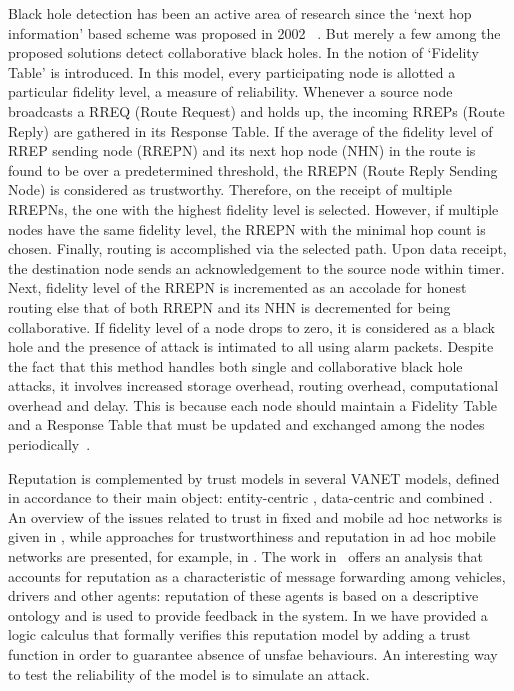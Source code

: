 \documentclass[compsoc, conference, letterpaper, 10pt, times]{IEEEtran}
\begin{document}
Black hole detection has been an active area of research since the `next hop information' based scheme was proposed in 2002~\cite{survey8} .
But merely a few among the proposed solutions detect collaborative black holes. In \cite{survey6} the notion of `Fidelity Table' is introduced. In this model, every participating node is allotted a particular fidelity level, a measure of reliability. Whenever a source node broadcasts a RREQ (Route Request) and holds up, the incoming RREPs (Route Reply) are gathered in its Response Table. If the average of the fidelity level of RREP sending node (RREPN) and its next hop node (NHN) in the route is found to be over a predetermined threshold, the RREPN (Route Reply Sending Node) is considered as trustworthy. Therefore, on the receipt of multiple RREPNs, the one with the highest fidelity level is selected. However, if multiple nodes have the same fidelity level, the RREPN with the minimal hop count is
chosen. Finally, routing is accomplished via the selected path. Upon data receipt, the destination node sends an acknowledgement to the source node within timer. Next, fidelity level of the RREPN
is incremented as an accolade for honest routing else that of both RREPN and its NHN is decremented for being collaborative. If fidelity level of a node drops to zero, it is considered as a black hole and the presence of attack is intimated to all using alarm packets. Despite the fact that this method handles both single and collaborative black hole attacks, it involves increased storage overhead, routing overhead, computational overhead and delay. This is because each node should maintain a Fidelity Table and a Response Table that must be updated and exchanged among the
nodes periodically~\cite{survey7}.

Reputation is complemented by trust models in several VANET models, defined in accordance to their main object: entity-centric \cite{Minhas:2011:MAM:2334807.2334820, GomezMarmol:2012:TTR:2160992.2161100}, data-centric \cite{DBLP:conf/infocom/RayaPGH08, Lo:2009:RST:1598776.1945486} and combined \cite{Wei2012}. An overview of the issues related to trust in fixed and mobile ad hoc networks is given in \cite{DBLP:conf/vtc/WexBHLD08}, while approaches for trustworthiness and reputation in ad hoc mobile networks are presented, for example, in \cite{DBLP:conf/um/FinnsonZTMC12, DBLP:journals/ijaisc/ChaurasiaTV15}. The work in~\cite{glenford} offers an analysis that accounts for reputation as a characteristic of message forwarding among vehicles, drivers and other agents: reputation of these agents is based on a descriptive ontology and is used to provide feedback in the system. In \cite{DBLP:conf/eurosp/PrimieroRCN17} we have provided a logic calculus that formally verifies this reputation model by adding a trust function in order to guarantee absence of unsfae behaviours. An interesting way to test the reliability of the model is to simulate an attack.
\end{document}
